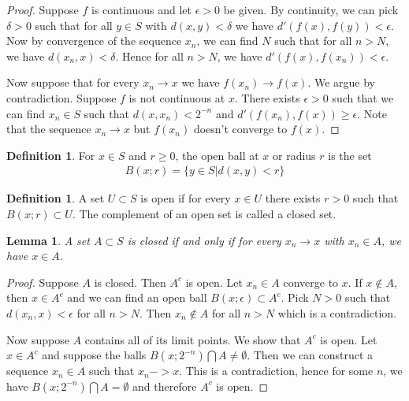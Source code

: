 \documentclass{amsart}
\newtheorem{lem}[thm]{Lemma}
\theoremstyle{remark}
\theoremstyle{definition}
\newtheorem{defn}[thm]{Definition}
\begin{document}
\begin{proof}
Suppose $f$ is continuous and let $\epsilon > 0$ be given.  By
continuity, we can pick $\delta > 0$ such that for all $y \in S$
with $d(x,y) < \delta$ we have $d'(f(x), f(y)) < \epsilon$.  Now by
convergence of the sequence $x_n$, we can find $N$ such that for all
$n>N$, we have $d(x_n,x) < \delta$.  Hence for all $n > N$, we have
$d'(f(x), f(x_n)) < \epsilon$.

Now suppose that for every $x_n \to x$ we have $f(x_n) \to f(x)$.  We
argue by contradiction.  Suppose $f$ is not continuous at $x$.  There
exists $\epsilon > 0$ such that we can find $x_n \in S$ such that
$d(x,x_n) < 2 ^ {-n}$ and $d'(f(x_n), f(x)) \geq \epsilon$.  Note that
the sequence $x_n \to x$ but $f(x_n)$ doesn't converge to $f(x)$.
\end{proof}
\begin{defn}For $x\in S$ and $r \geq 0$, the open ball at $x$ or
  radius $r$ is the set
\begin{align*}
B(x;r) = \{y\in S | d(x,y) < r \}
\end{align*}
\end{defn}
\begin{defn}A set $U \subset S$ is open if for every $x \in U$ there
  exists $r>0$ such that $B(x;r) \subset U$.  The complement of an
  open set is called a closed set.
\end{defn}
\begin{lem}A set $A \subset S$ is closed if and only if for every $x_n
  \to x$ with $x_n \in A$, we have $x \in A$.
\end{lem}
\begin{proof}
Suppose $A$ is closed.  Then $A^c$ is open.  Let $x_n \in A$ converge
to $x$.  If $x \notin A$, then $x \in A^c$ and we can find an open
ball $B(x;\epsilon) \subset A^c$.  Pick $N>0$ such that $d(x_n, x) <
\epsilon$ for all $n > N$.  Then $x_n \notin A$ for all $n>N$ which is
a contradiction.

Now suppose $A$ contains all of its limit points.  We show that $A^c$
is open.  Let $x\in A^c$ and suppose the balls $B(x;2^{-n}) \bigcap A
\ne \emptyset$.  Then we can construct a sequence $x_n \in A$ such
that $x_n ->x$.  This is a contradiction, hence for some $n$, we have 
$B(x;2^{-n}) \bigcap A = \emptyset$ and therefore $A^c$ is open.
\end{proof}
\end{document}
